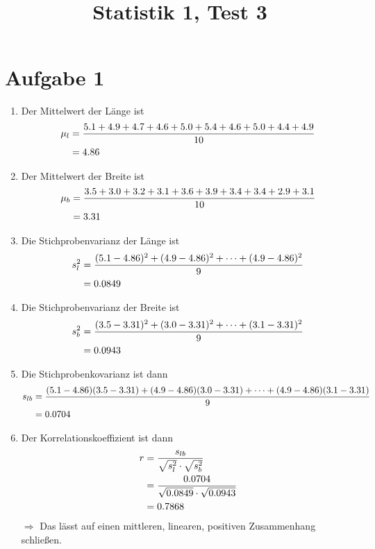 \documentclass{article}
\title{\textbf{Statistik 1, Test 3}}
\date{}
\begin{document}
	\maketitle
	
	\section*{Aufgabe 1}
	\begin{enumerate}[label=(\alph*)]
		\item Der Mittelwert der Länge ist
		\begin{align}
			\mu_l &= \frac{5.1 + 4.9 + 4.7 + 4.6 + 5.0 + 5.4 + 4.6 + 5.0 + 4.4 + 4.9}{10} \notag \\
			&= 4.86 \notag
		\end{align}
		\item Der Mittelwert der Breite ist
		\begin{align}
			\mu_b &= \frac{3.5 + 3.0 + 3.2 + 3.1 + 3.6 + 3.9 + 3.4 + 3.4 + 2.9 + 3.1}{10} \notag \\
			&= 3.31 \notag
		\end{align}
		\item Die Stichprobenvarianz der Länge ist
		\begin{align}
			s_l^2 &= \frac{(5.1-4.86)^2 + (4.9-4.86)^2 + \dots + (4.9-4.86)^2}{9} \notag \\
			&= 0.0849 \notag
		\end{align}
		\item Die Stichprobenvarianz der Breite ist
		\begin{align}
			s_b^2 &= \frac{(3.5-3.31)^2 + (3.0-3.31)^2 + \dots + (3.1-3.31)^2}{9} \notag \\
			&= 0.0943 \notag
		\end{align}
		\item Die Stichprobenkovarianz ist dann
		\begin{align}
			s_{lb} &= \frac{(5.1-4.86)(3.5-3.31) + (4.9-4.86)(3.0-3.31) + \dots + (4.9-4.86)(3.1-3.31)}{9} \notag \\
			&= 0.0704 \notag
		\end{align}
		\item Der Korrelationskoeffizient ist dann
		\begin{align}
			r &= \frac{s_{lb}}{\sqrt{s^2_l}\cdot \sqrt{s_b^2}} \notag \\
			&= \frac{0.0704}{\sqrt{0.0849} \cdot \sqrt{0.0943}} \notag \\
			&= 0.7868 \notag
		\end{align}
		$\Rightarrow$ Das lässt auf einen mittleren, linearen, positiven Zusammenhang schließen.
	\end{enumerate}
\end{document}
